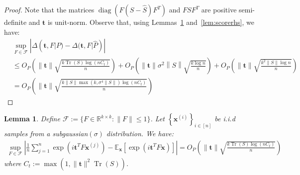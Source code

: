 \documentclass[letterpaper]{article}
\newtheorem{lemma}[theorem]{Lemma}
\newcommand{\bas}[1]{\begin{align*}#1\end{align*}}
\newcommand{\bx}{\pmb{x}}
\newcommand{\bt}{\pmb{t}}
\newcommand{\nt}{\|\bt\|}
\newcommand{\nts}{\|\bt\|^2}
\newcommand{\E}{\mathbb{E}}
\newcommand{\norm}[1]{\left\|#1\right\|}
\newcommand{\bb}[1]{\left(#1\right)}
\newcommand{\bbb}[1]{\left[#1\right]}
\DeclareMathOperator{\Tr}{Tr}
\DeclareMathOperator{\diag}{diag}
\begin{document}
\begin{proof}
Note that the matrices $\diag\bb{F (S-\widehat{S}) F^T}$ and $FSF^{T}$ are positive semi-definite and $\bt$ is unit-norm. Observe that, using Lemmas~\ref{lem:scorelhs} and~\ref{lem:scorerhs}, we have:
\bas{
    &\sup_{F\in \mathcal{F}}|\Delta(\bt,F|P)-\Delta(\bt,F|\hat{P})|
    \\ &\leq O_P\bb{\nt\sqrt{\frac{k\Tr(S)\log\bb{nC_{t}}}{n}}}
    +O_P\bb{ \nt\sigma^{2}\norm{S}\sqrt{\frac{k\log n}{n}}}+O_P\bb{\nt\sqrt{\frac{k^2\|S\|\log n}{n}}}\\
&=O_P\bb{\nt\sqrt{\frac{k\|S\|\max(k,\sigma^{4}\|S\|)\log (nC_t)}{n}}}
}
\end{proof}
 
\begin{lemma}\label{lem:scorelhs}
    Define $\mathcal{F}:=\{F\in \mathbb{R}^{k\times k}:\|F\|\leq 1\}$. Let $\left\{\bx^{(i)}\right\}_{i \in [n]}$ be i.i.d samples from a subgaussian$\bb{\sigma}$ distribution. We have: %
    \bas{
        \sup_{F\in \mathcal{F}}\left|\frac{1}{n}\sum_{j=1}^{n}\exp(i\bt^TF\bx^{\bb{j}})-\E_{\bx}\bbb{\exp(i \bt^T F\bx)}\right| = O_P\bb{\nt\sqrt{\frac{k\Tr(S)\log\bb{nC_{t}}}{n}}}
    }
    where $C_{t} := \max(1,
    \nts\Tr(S))$.
\end{lemma}
\end{document}
